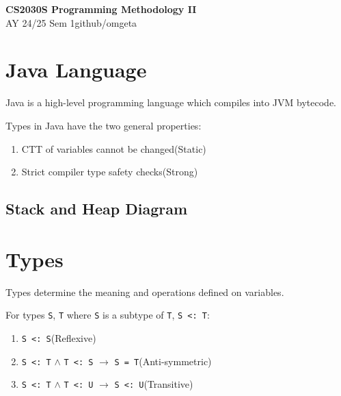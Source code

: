\documentclass[12pt, a4paper]{article}
\newcommand{\mytitle}{CS2030S Programming Methodology II}
\newcommand{\myauthor}{github/omgeta}
\newcommand{\mydate}{AY 24/25 Sem 1}
\begin{document}
\raggedright
\footnotesize
\begin{multicols*}{3}
\setlength{\premulticols}{1pt}
\setlength{\postmulticols}{1pt}
\setlength{\multicolsep}{1pt}
\setlength{\columnsep}{2pt}

{\normalsize{\textbf{\mytitle}}} \\
{\footnotesize{\mydate\hspace{2pt}\textemdash\hspace{2pt}\myauthor}}

\section{Java Language}
Java is a high-level programming language which compiles into JVM bytecode.
\begin{center}
\end{center}

Types in Java have the two general properties:
\begin{enumerate}[\roman*.]
  \item CTT of variables cannot be changed\hfill(Static)
  \item Strict compiler type safety checks\hfill(Strong)
\end{enumerate}

\subsection{Stack and Heap Diagram}
\begin{center}
\end{center}


\section{Types}
Types determine the meaning and operations defined on variables. 

For types \lstinline|S|, \lstinline|T| where \lstinline|S| is a subtype of \lstinline|T|, \lstinline|S <: T|:
\begin{enumerate}[\roman*.]
  \item \lstinline|S <: S|\hfill(Reflexive)
  \item \lstinline|S <: T| $\land$ \lstinline|T <: S| $\rightarrow$ \lstinline|S = T|\hfill(Anti-symmetric)
  \item \lstinline|S <: T| $\land$ \lstinline|T <: U| $\rightarrow$ \lstinline|S <: U|\hfill(Transitive)
\end{enumerate}


\end{multicols*}
\end{document}
